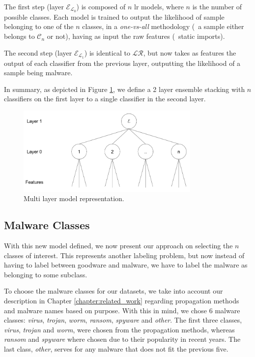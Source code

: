 The first step (layer $\mathcal{E}_{\mathcal{L}_{0}}$) is composed of $n$ \gls{lr} models, where $n$ is the number of possible classes.
Each model is trained to output the likelihood of sample belonging to one of the $n$ classes, in a \textit{one-vs-all} methodology (\ie\ a sample either belongs to $\mathcal{C}_{n}$ or not), having as input the raw features (\eg\ static imports).

The second step (layer $\mathcal{E}_{\mathcal{L}_{1}}$) is identical to $\mathcal{LR}$, but now takes as features the output of each classifier from the previous layer, outputting the likelihood of a sample being malware.

In summary, as depicted in Figure \ref{fig:dia_multilayer}, we define a 2 layer ensemble stacking with $n$ classifiers on the first layer to a single classifier in the second layer.

\begin{figure}[!htb]
	\centering
	\includegraphics[width=0.8\textwidth]{Figures/dia_multilayer.png}
	\caption{Multi layer model representation.}
	\label{fig:dia_multilayer}
\end{figure}

\subsection{Malware Classes}

With this new model defined, we now present our approach on selecting the $n$ classes of interest.
This represents another labeling problem, but now instead of having to label between goodware and malware, we have to label the malware as belonging to some subclass.

To choose the malware classes for our datasets, we take into account our description in Chapter \ref{chapter:related_work} regarding propagation methods and malware names based on purpose.
With this in mind, we chose 6 malware classes: \textit{virus}, \textit{trojan}, \textit{worm}, \textit{ransom}, \textit{spyware} and \textit{other}.
The first three classes, \textit{virus}, \textit{trojan} and \textit{worm}, were chosen from the propagation methods, whereas \textit{ransom} and \textit{spyware}
where chosen due to their popularity in recent years. The last class, \textit{other}, serves for any malware that does not fit the previous five.

